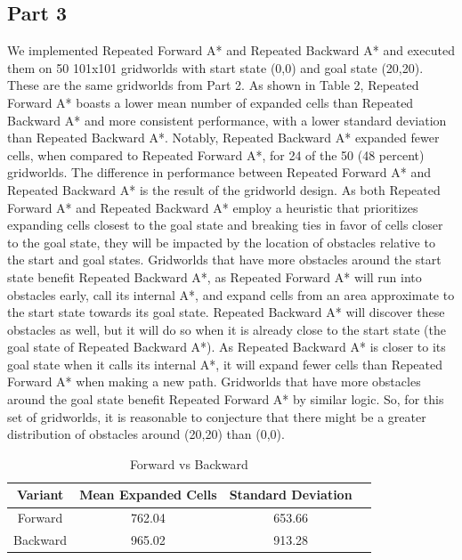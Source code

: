\documentclass{article}
\begin{document}
\subsection*{Part 3}
We implemented Repeated Forward A* and Repeated Backward A* and executed them on 50 101x101 gridworlds with start state (0,0) and goal state (20,20). These are the same gridworlds from Part 2. As shown in Table 2, Repeated Forward A* boasts a lower mean number of expanded cells than Repeated Backward A* and more consistent performance, with a lower standard deviation than Repeated Backward A*. Notably, Repeated Backward A* expanded fewer cells, when compared to Repeated Forward A*, for 24 of the 50 (48 percent) gridworlds. The difference in performance between Repeated Forward A* and Repeated Backward A* is the result of the gridworld design. As both Repeated Forward A* and Repeated Backward A* employ a heuristic that prioritizes expanding cells closest to the goal state and breaking ties in favor of cells closer to the goal state, they will be impacted by the location of obstacles relative to the start and goal states. Gridworlds that have more obstacles around the start state benefit Repeated Backward A*, as Repeated Forward A* will run into obstacles early, call its internal A*, and expand cells from an area approximate to the start state towards its goal state. Repeated Backward A* will discover these obstacles as well, but it will do so when it is already close to the start state (the goal state of Repeated Backward A*). As Repeated Backward A* is closer to its goal state when it calls its internal A*, it will expand fewer cells than Repeated Forward A* when making a new path. Gridworlds that have more obstacles around the goal state benefit Repeated Forward A* by similar logic. So, for this set of gridworlds, it is reasonable to conjecture that there might be a greater distribution of obstacles around (20,20) than (0,0).\\

\begin{table}[!h]
    \centering
    \small
    \begin{tabular}{cccc}
        \hline
         Variant & Mean Expanded Cells & Standard Deviation\\
         \hline
         Forward & 762.04 & 653.66\\
         Backward & 965.02 & 913.28\\
        \hline
    \end{tabular}
    \caption{Forward vs Backward}
    \label{tab:my_label}
\end{table}
\end{document}
